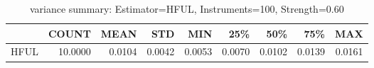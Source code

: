 \begin{table}[ht]
\centering
\caption{variance summary: Estimator=HFUL, Instruments=100, Strength=0.60}
\begin{tabular}{lrrrrrrrr}
\toprule
 & COUNT & MEAN & STD & MIN & 25\% & 50\% & 75\% & MAX \\
\midrule
HFUL & 10.0000 & 0.0104 & 0.0042 & 0.0053 & 0.0070 & 0.0102 & 0.0139 & 0.0161 \\
\bottomrule
\end{tabular}
\end{table}
